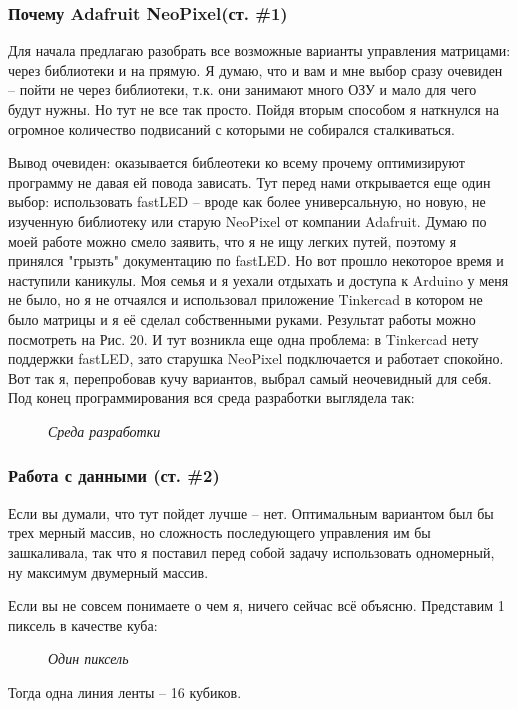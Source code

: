 \documentclass[a4paper, 12pt]{article}
\newcommand{\image}[3]{
	\begin{figure}[ht]
		\center{\texttt{[image: img/\#1]} }
		\caption{\textit{#3}}\end{figure}
}
\begin{document}
\newpage
\subsubsection{Почему  Adafruit NeoPixel(ст. \#1)}

Для начала предлагаю разобрать все возможные варианты управления матрицами:
через библиотеки и на прямую. Я думаю, что и вам и мне выбор сразу очевиден --
пойти не через библиотеки, т.к. они занимают много ОЗУ и мало для чего будут
нужны. Но тут не все так просто. Пойдя вторым способом я наткнулся на огромное
количество подвисаний с которыми не собирался сталкиваться.

Вывод очевиден: оказывается библеотеки ко всему прочему оптимизируют программу
не давая ей повода зависать. Тут перед нами открывается еще один выбор:
использовать fastLED -- вроде как более универсальную, но новую, не изученную
библиотеку или старую NeoPixel от компании Adafruit. Думаю по моей работе можно
смело заявить, что я не ищу легких путей, поэтому я принялся "грызть"
документацию по fastLED. Но вот прошло некоторое время и наступили каникулы.
Моя семья и я уехали отдыхать и доступа к Arduino у меня не было, но я не
отчаялся и использовал приложение Tinkercad в котором не было матрицы и я её
сделал собственными руками. Результат работы можно посмотреть на Рис. 20.
И тут возникла еще одна проблема: в Tinkercad нету поддержки fastLED, зато
старушка NeoPixel подключается и работает спокойно. Вот так я, перепробовав
кучу вариантов, выбрал самый неочевидный для себя. Под конец программирования
вся среда разработки выглядела так:

\image{Среда.png}{80}{Среда разработки}

\newpage

\subsubsection{Работа с данными (ст. \#2)}

Если вы думали, что тут пойдет лучше -- нет. Оптимальным вариантом был бы
трех мерный массив, но сложность последующего управления им бы зашкаливала,
так что я поставил перед собой задачу использовать одномерный, ну максимум
двумерный массив.

Если вы не совсем понимаете о чем я, ничего сейчас всё объясню. Представим 1
пиксель в качестве куба:

\image{Куб.png}{150}{Один пиксель}

Тогда одна линия ленты -- 16 кубиков.
\end{document}
